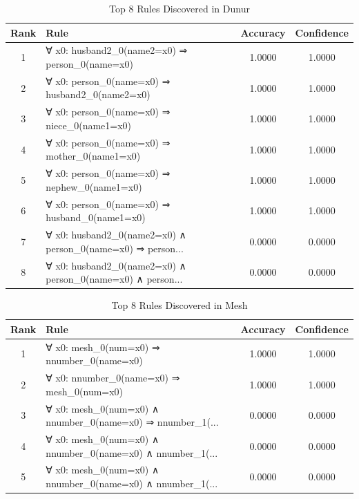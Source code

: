 \documentclass[11pt,a4paper]{article}
\begin{document}
\begin{table}[h!]
\centering
\small
\caption{Top 8 Rules Discovered in Dunur}
\label{tab:rules_Dunur}
\begin{tabular}{|c|p{5cm}|c|c|}
\hline
\textbf{Rank} & \textbf{Rule} & \textbf{Accuracy} & \textbf{Confidence} \\
\hline
1 & ∀ x0: husband2\_0(name2=x0) ⇒ person\_0(name=x0) & 1.0000 & 1.0000 \\
2 & ∀ x0: person\_0(name=x0) ⇒ husband2\_0(name2=x0) & 1.0000 & 1.0000 \\
3 & ∀ x0: person\_0(name=x0) ⇒ niece\_0(name1=x0) & 1.0000 & 1.0000 \\
4 & ∀ x0: person\_0(name=x0) ⇒ mother\_0(name1=x0) & 1.0000 & 1.0000 \\
5 & ∀ x0: person\_0(name=x0) ⇒ nephew\_0(name1=x0) & 1.0000 & 1.0000 \\
6 & ∀ x0: person\_0(name=x0) ⇒ husband\_0(name1=x0) & 1.0000 & 1.0000 \\
7 & ∀ x0: husband2\_0(name2=x0) ∧ person\_0(name=x0) ⇒ person... & 0.0000 & 0.0000 \\
8 & ∀ x0: husband2\_0(name2=x0) ∧ person\_0(name=x0) ∧ person... & 0.0000 & 0.0000 \\
\hline
\end{tabular}
\end{table}

\begin{table}[h!]
\centering
\small
\caption{Top 8 Rules Discovered in Mesh}
\label{tab:rules_Mesh}
\begin{tabular}{|c|p{5cm}|c|c|}
\hline
\textbf{Rank} & \textbf{Rule} & \textbf{Accuracy} & \textbf{Confidence} \\
\hline
1 & ∀ x0: mesh\_0(num=x0) ⇒ nnumber\_0(name=x0) & 1.0000 & 1.0000 \\
2 & ∀ x0: nnumber\_0(name=x0) ⇒ mesh\_0(num=x0) & 1.0000 & 1.0000 \\
3 & ∀ x0: mesh\_0(num=x0) ∧ nnumber\_0(name=x0) ⇒ nnumber\_1(... & 0.0000 & 0.0000 \\
4 & ∀ x0: mesh\_0(num=x0) ∧ nnumber\_0(name=x0) ∧ nnumber\_1(... & 0.0000 & 0.0000 \\
5 & ∀ x0: mesh\_0(num=x0) ∧ nnumber\_0(name=x0) ∧ nnumber\_1(... & 0.0000 & 0.0000 \\
\hline
\end{tabular}
\end{table}
\end{document}
